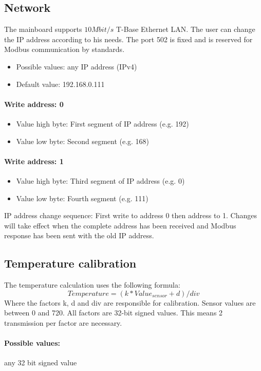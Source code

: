 \subsection{Network}
The mainboard supports $10 Mbit/s$ T-Base Ethernet LAN. The user can change the IP address according to his needs. The port 502 is fixed and is reserved for Modbus communication by standards.

\begin{itemize}
    \item Possible values: any IP address (IPv4)
    \item Default value: 192.168.0.111
\end{itemize}

\paragraph{Write address: 0} 
\begin{itemize}
    \item Value high byte: First segment of IP address (e.g. 192)
    \item Value low byte: Second segment (e.g. 168)
\end{itemize}

\paragraph{Write address: 1} 
\begin{itemize}
    \item Value high byte: Third segment of IP address (e.g. 0)
    \item  Value low byte: Fourth segment (e.g. 111)
\end{itemize}

IP address change sequence: First write to address 0 then address to 1. Changes will take effect when the complete address has been received and Modbus response has been sent with the old IP address.

\subsection{Temperature calibration}
The temperature calculation uses the following formula:
\[
Temperature = (k * Value_{sensor} + d) / div
\]
Where the factors k, d and div are responsible for calibration. Sensor values are between 0 and 720. All factors are 32-bit signed values. This means 2 transmission per factor are necessary.

\paragraph{Possible values:} any 32 bit signed value

